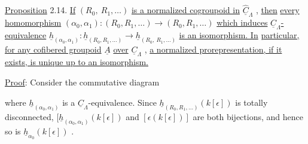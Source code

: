 \underline{Proposition} 2.14.  \underline{If} $(R_0,\ R_1,\ldots)$ \underline{is a normalized cogroupoid in} $\widehat{\underline{C}}_\Lambda$ , \underline{then} \underline{every homomorphism} $(\alpha_0,\alpha_1) : (R_0,R_1,\ldots) \to (R_0,R_1,\ldots)$ \underline{which induces} $\underline{C}_\Lambda$\underline{-equivalence} $\underline{h}_{(\alpha_0,\alpha_1)} : \underline{h}_{(R_0,R_1,\ldots)} \longrightarrow \underline{h}_{(R_0,\ R_1,\ldots)}$ \underline{is an isomorphism. In}
\underline{particular, for any cofibered groupoid} $\underline{A}$ \underline{over} $\underline{C}_\Lambda$ , \underline{a normalized prorepresentation, if it exists, is unique up to an isomorphism.}

\underline{Proof}:  Consider the commutative diagram

\begin{center}
\end{center}
where $\underline{h}_{(\alpha_0,\alpha_1)}$ is a $\underline{C}_\Lambda$-equivalence. Since $\underline{h}_{(R_0,R_1,\ldots)}(k[\epsilon])$ is totally disconnected, $[\underline{h}_{(\alpha_0,\alpha_1)}(k[\epsilon])$ and $[\epsilon(k[\epsilon])]$ are both bijections, and hence so is $\underline{h}_{\alpha_0}(k[\epsilon])$ .

